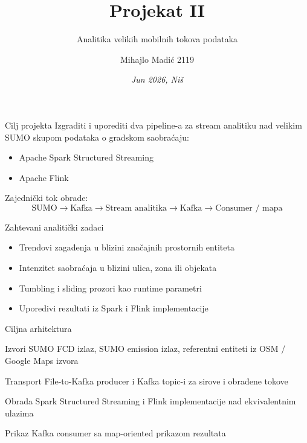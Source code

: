\documentclass[aspectratio=169,11pt]{beamer}
\title{Projekat II}
\subtitle[Analitika mobilnih tokova]{Analitika velikih mobilnih tokova podataka}
\author[Mihajlo Madić 2119]{Mihajlo Madić 2119}
\institute[Big Data Systems]{Big Data Systems}
\date{\small{\textit{Jun 2026, Niš}}}
\begin{document}
\begin{frame}
  \titlepage
\end{frame}

\begin{frame}{Cilj projekta}
  Izgraditi i uporediti dva pipeline-a za stream analitiku nad velikim SUMO skupom podataka o gradskom saobraćaju:

  \begin{itemize}
    \item Apache Spark Structured Streaming
    \item Apache Flink
  \end{itemize}

  Zajednički tok obrade:
  \[
    \text{SUMO} \rightarrow \text{Kafka} \rightarrow \text{Stream analitika} \rightarrow \text{Kafka} \rightarrow \text{Consumer / mapa}
  \]
\end{frame}

\begin{frame}{Zahtevani analitički zadaci}
  \begin{itemize}
    \item Trendovi zagađenja u blizini značajnih prostornih entiteta
    \item Intenzitet saobraćaja u blizini ulica, zona ili objekata
    \item Tumbling i sliding prozori kao runtime parametri
    \item Uporedivi rezultati iz Spark i Flink implementacije
  \end{itemize}
\end{frame}

\begin{frame}{Ciljna arhitektura}
  \begin{block}{Izvori}
    SUMO FCD izlaz, SUMO emission izlaz, referentni entiteti iz OSM / Google Maps izvora
  \end{block}

  \begin{block}{Transport}
    File-to-Kafka producer i Kafka topic-i za sirove i obrađene tokove
  \end{block}

  \begin{block}{Obrada}
    Spark Structured Streaming i Flink implementacije nad ekvivalentnim ulazima
  \end{block}

  \begin{block}{Prikaz}
    Kafka consumer sa map-oriented prikazom rezultata
  \end{block}
\end{frame}
\end{document}
